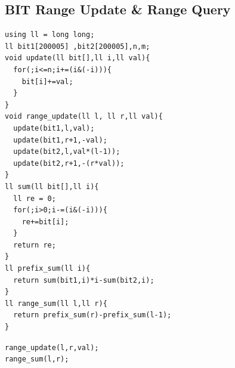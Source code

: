 \subsection{BIT Range Update \texorpdfstring{\&}{&} Range Query}
\begin{verbatim}
using ll = long long;
ll bit1[200005] ,bit2[200005],n,m;
void update(ll bit[],ll i,ll val){
  for(;i<=n;i+=(i&(-i))){
    bit[i]+=val;
  }
}
void range_update(ll l, ll r,ll val){
  update(bit1,l,val);
  update(bit1,r+1,-val);
  update(bit2,l,val*(l-1));
  update(bit2,r+1,-(r*val));
}
ll sum(ll bit[],ll i){
  ll re = 0;
  for(;i>0;i-=(i&(-i))){
    re+=bit[i];
  }
  return re;
}
ll prefix_sum(ll i){
  return sum(bit1,i)*i-sum(bit2,i);
}
ll range_sum(ll l,ll r){
  return prefix_sum(r)-prefix_sum(l-1);
}
\end{verbatim}
\texttt{range\_update(l,r,val);}\\
\texttt{range\_sum(l,r);}
